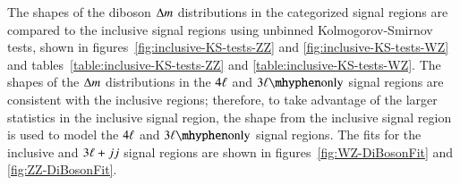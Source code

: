 

The shapes of the diboson $\Delta m$ distributions in the categorized signal regions are compared to the inclusive signal regions using unbinned Kolmogorov-Smirnov tests, shown in figures~\ref{fig:inclusive-KS-tests-ZZ} and \ref{fig:inclusive-KS-tests-WZ} and tables~\ref{table:inclusive-KS-tests-ZZ} and \ref{table:inclusive-KS-tests-WZ}. The shapes of the $\Delta m$ distributions in the $4\ell$ and $\threelo$ signal regions are consistent with the inclusive regions; therefore, to take advantage of the larger statistics in the inclusive signal region, the shape from the inclusive signal region is used to model the $4\ell$ and $\threelo$ signal regions. The fits for the inclusive and $3\ell+jj$ signal regions are shown in figures~\ref{fig:WZ-DiBosonFit} and \ref{fig:ZZ-DiBosonFit}.
 
